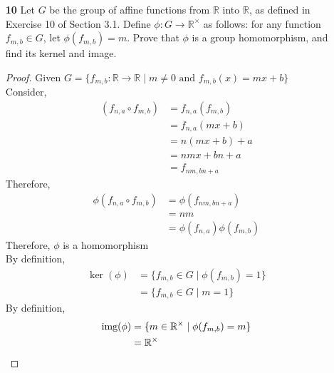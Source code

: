 \documentclass[paper=usletter, fontsize=12pt]{article}
\begin{document}
\begin{itemize}
\begin{enumerate}
\begin{enumerate}
\begin{proof}
                \end{proof}

            \end{enumerate}

            \item[\textbf{10}] Let $G$ be the group of affine functions from
            $\mathbb{R}$ into $\mathbb{R}$, as defined in Exercise 10 of
            Section 3.1. Define $\phi:G \rightarrow \mathbb{R}^{\times}$ as
            follows: for any function $f_{m,b} \in G$, let $\phi(f_{m,b})=m$.
            Prove that $\phi$ is a group homomorphism, and find its kernel and
            image.
            \begin{proof}

                Given $G = \{f_{m,b}: \mathbb{R} \rightarrow \mathbb{R} \mid m \neq 0 \text{ and } f_{m,b}(x)=mx+b\}$\\
                Consider,
                \begin{align*}
                    (f_{n,a} \circ f_{m,b}) & = f_{n,a}(f_{m,b})\\
                    & = f_{n,a}(mx+b)\\
                    & = n(mx+b)+a\\
                    & = nmx+bn+a\\
                    & = f_{nm,bn+a}
                \end{align*}
                Therefore,
                \begin{align*}
                    \phi(f_{n,a} \circ f_{m,b}) & = \phi(f_{nm,bn+a})\\
                    & = nm\\
                    & = \phi(f_{n,a})\phi(f_{m,b})
                \end{align*}
                Therefore, $\phi$ is a homomorphism\\
                By definition,
                \begin{align*}
                    \ker(\phi) & = \{f_{m,b} \in G \mid \phi(f_{m,b})=1\}\\
                    & = \{f_{m,b} \in G \mid m=1\}
                \end{align*}
                By definition,
                \begin{align*}
                    \text{img}(\phi) & = \{m \in \mathbb{R}^{\times} \mid \phi(f_{m,b})=m\}\\
                    & = \mathbb{R}^{\times} \qedhere
                \end{align*}


\end{proof}
\end{enumerate}
\end{itemize}
\end{document}
